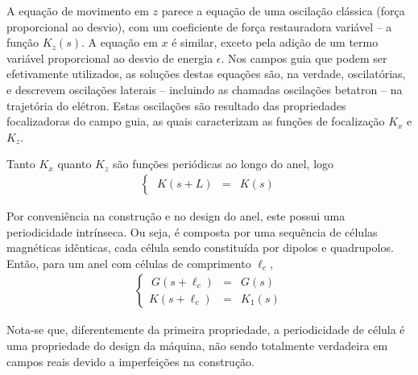A equação de movimento em $z$ parece a equação de uma oscilação clássica (força proporcional ao desvio), com um coeficiente de força restauradora variável -- a função $K_z(s)$. A equação em $x$ é similar, exceto pela adição de um termo variável proporcional ao desvio de energia $\epsilon$. Nos campos guia que podem ser efetivamente utilizados, as soluções destas equações são, na verdade, oscilatórias, e descrevem oscilações laterais -- incluindo as chamadas oscilações betatron -- na trajetória do elétron. Estas oscilações são resultado das propriedades focalizadoras do campo guia, as quais caracterizam as funções de focalização $K_x$ e $K_z$.

Tanto $K_x$ quanto $K_z$ são funções periódicas ao longo do anel, logo
\begin{align}
	\left\{\begin{array}{rcl}
	\ K(s+L) & = & K(s)
	\end{array}\right.
\end{align}

Por conveniência na construção e no design do anel, este possui uma periodicidade intrínseca. Ou seja, é composta por uma sequência de células magnéticas idênticas, cada célula sendo constituída por dipolos e quadrupolos. Então, para um anel com células de comprimento $\ell_c$,
\begin{align}
	\left\{\begin{array}{rcl}
	\ G(s+\ell_c) & = & G(s)\\
	K(s+\ell_c) & = & K_1(s)
	\end{array}\right.
\end{align}

Nota-se que, diferentemente da primeira propriedade, a periodicidade de célula é uma propriedade do design da máquina, não sendo totalmente verdadeira em campos reais devido a imperfeições na construção.